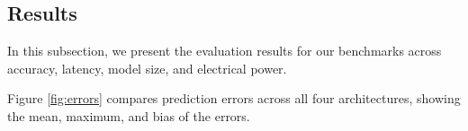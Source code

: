 \documentclass[final,3p,times]{elsarticle}
\begin{document}

\subsection{Results}







In this subsection, we present the evaluation results for our benchmarks across accuracy, latency, model size, and electrical power.

Figure \ref{fig:errors} compares prediction errors across all four architectures, showing the mean, maximum, and bias of the errors. 
\end{document}

